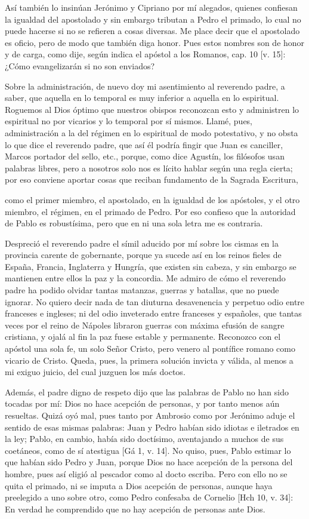 Así también lo insinúan Jerónimo y Cipriano por mí alegados, quienes confiesan la igualdad del apostolado y sin embargo tributan a Pedro el primado, lo cual no puede hacerse si no se refieren a cosas diversas. \marginpar{\small[316]} Me place decir que el apostolado es oficio, pero de modo que también diga honor. Pues estos nombres son de honor y de carga, como dije, según indica el apóstol a los Romanos, cap. 10 [v. 15]: ¿Cómo evangelizarán si no son enviados?

Sobre la administración, de nuevo doy mi asentimiento al reverendo padre, a saber, que aquella en lo temporal es muy inferior a aquella en lo espiritual. Roguemos al Dios óptimo que nuestros obispos reconozcan esto y administren lo espiritual no por vicarios y lo temporal por sí mismos. Llamé, pues, administración a la del régimen en lo espiritual de modo potestativo, y no obsta lo que dice el reverendo padre, que así él podría fingir que Juan es canciller, Marcos portador del sello, etc., porque, como dice Agustín, los filósofos usan palabras libres, pero a nosotros solo nos es lícito hablar según una regla cierta; por eso conviene aportar cosas que reciban fundamento de la Sagrada Escritura,

como el primer miembro, el apostolado, en la igualdad de los apóstoles, y el otro miembro, el régimen, en el primado de Pedro. Por eso confieso que la autoridad de Pablo es robustísima, pero que en ni una sola letra me es contraria.

Despreció el reverendo padre el símil aducido por mí sobre los cismas en la provincia carente de gobernante, porque ya sucede así en los reinos fieles de España, Francia, Inglaterra y Hungría, que existen sin cabeza, y sin embargo se mantienen entre ellos la paz y la concordia. Me admiro de cómo el reverendo padre ha podido olvidar tantas matanzas, guerras y batallas, que no puede ignorar. No quiero decir nada de tan diuturna desavenencia y perpetuo odio entre franceses e ingleses; ni del odio inveterado entre franceses y españoles, que tantas veces por el reino de Nápoles libraron guerras con máxima efusión de sangre cristiana, y ojalá al fin la paz fuese estable y permanente. Reconozco con el apóstol una sola fe, un solo Señor Cristo, pero venero al pontífice romano como vicario de Cristo. Queda, pues, la primera solución invicta y válida, al menos a mi exiguo juicio, del cual juzguen los más doctos.

Además, el padre digno de respeto dijo que las palabras de Pablo no han sido tocadas por mí: Dios no hace acepción de personas, y por tanto menos aún resueltas. Quizá oyó mal, pues tanto por Ambrosio como por Jerónimo aduje el sentido de esas mismas palabras: Juan y Pedro habían sido idiotas e iletrados en la ley; Pablo, en cambio, había sido doctísimo, aventajando a muchos de sus coetáneos, como de sí atestigua [Gá 1, v. 14]. No quiso, pues, Pablo estimar lo que habían sido Pedro y Juan, porque Dios no hace acepción de la persona del hombre, pues así eligió al pescador como al docto escriba. Pero con ello no se quita el primado, ni se imputa a Dios acepción de personas, aunque haya preelegido a uno sobre otro, como Pedro confesaba de Cornelio [Hch 10, v. 34]: En verdad he comprendido que no hay acepción de personas ante Dios.


